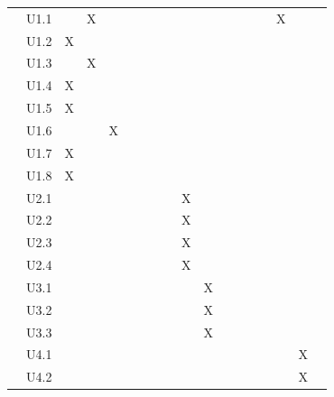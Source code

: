 \documentclass[hidelinks, 12pt, a4paper]{article}
\begin{document}
\begin{table}[H]
\begin{tabular}{|l|l|l|c|c|c|c|c|c|c|c|c|c|c|c|c|c|c|}
             & U1.1  &    & X  &    &    &    &    &    &    &    &     &     &     &     & X   &     \\ \cline{2-17}
             & U1.2  & X  &    &    &    &    &    &    &    &    &     &     &     &     &     &     \\ \cline{2-17}
             & U1.3  &    & X  &    &    &    &    &    &    &    &     &     &     &     &     &     \\ \cline{2-17}
             & U1.4  & X  &    &    &    &    &    &    &    &    &     &     &     &     &     &     \\ \cline{2-17}
             & U1.5  & X  &    &    &    &    &    &    &    &    &     &     &     &     &     &     \\ \cline{2-17}
             & U1.6  &    &    & X  &    &    &    &    &    &    &     &     &     &     &     &     \\ \cline{2-17}
             & U1.7  & X  &    &    &    &    &    &    &    &    &     &     &     &     &     &     \\ \cline{2-17}
             & U1.8  & X  &    &    &    &    &    &    &    &    &     &     &     &     &     &     \\ \cline{2-17}
             & U2.1  &    &    &    &    &    &    &    & X  &    &     &     &     &     &     &     \\ \cline{2-17}
             & U2.2  &    &    &    &    &    &    &    & X  &    &     &     &     &     &     &     \\ \cline{2-17}
             & U2.3  &    &    &    &    &    &    &    & X  &    &     &     &     &     &     &     \\ \cline{2-17}
             & U2.4  &    &    &    &    &    &    &    & X  &    &     &     &     &     &     &     \\ \cline{2-17}
             & U3.1  &    &    &    &    &    &    &    &    & X  &     &     &     &     &     &     \\ \cline{2-17}
             & U3.2  &    &    &    &    &    &    &    &    & X  &     &     &     &     &     &     \\ \cline{2-17}
             & U3.3  &    &    &    &    &    &    &    &    & X  &     &     &     &     &     &     \\ \cline{2-17}
             & U4.1  &    &    &    &    &    &    &    &    &    &     &     &     &     &     & X   \\ \cline{2-17}
             & U4.2  &    &    &    &    &    &    &    &    &    &     &     &     &     &     & X   \\ \cline{2-17}

\end{tabular}
\end{table}
\end{document}
